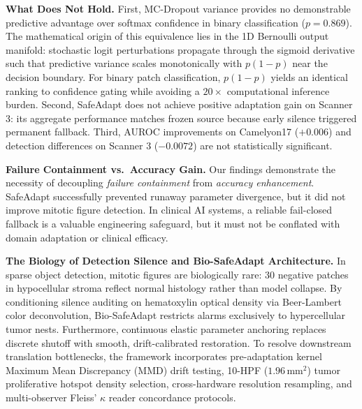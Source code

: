 \documentclass[conference]{IEEEtran}
\begin{document}
\textbf{What Does Not Hold.}
First, MC-Dropout variance provides no demonstrable predictive advantage over softmax confidence in binary classification ($p=0.869$).
The mathematical origin of this equivalence lies in the 1D Bernoulli output manifold: stochastic logit perturbations propagate through the sigmoid derivative such that predictive variance scales monotonically with $p(1-p)$ near the decision boundary.
For binary patch classification, $p(1-p)$ yields an identical ranking to confidence gating while avoiding a $20\times$ computational inference burden.
Second, SafeAdapt does not achieve positive adaptation gain on Scanner 3: its aggregate performance matches frozen source because early silence triggered permanent fallback.
Third, AUROC improvements on Camelyon17 ($+0.006$) and detection differences on Scanner 3 ($-0.0072$) are not statistically significant.

\textbf{Failure Containment vs.\ Accuracy Gain.}
Our findings demonstrate the necessity of decoupling \emph{failure containment} from \emph{accuracy enhancement}.
SafeAdapt successfully prevented runaway parameter divergence, but it did not improve mitotic figure detection.
In clinical AI systems, a reliable fail-closed fallback is a valuable engineering safeguard, but it must not be conflated with domain adaptation or clinical efficacy.

\textbf{The Biology of Detection Silence and Bio-SafeAdapt Architecture.}
In sparse object detection, mitotic figures are biologically rare: 30 negative patches in hypocellular stroma reflect normal histology rather than model collapse.
By conditioning silence auditing on hematoxylin optical density via Beer-Lambert color deconvolution, Bio-SafeAdapt restricts alarms exclusively to hypercellular tumor nests.
Furthermore, continuous elastic parameter anchoring replaces discrete shutoff with smooth, drift-calibrated restoration.
To resolve downstream translation bottlenecks, the framework incorporates pre-adaptation kernel Maximum Mean Discrepancy (MMD) drift testing, 10-HPF ($1.96\,\text{mm}^2$) tumor proliferative hotspot density selection, cross-hardware resolution resampling, and multi-observer Fleiss' $\kappa$ reader concordance protocols.
\end{document}

